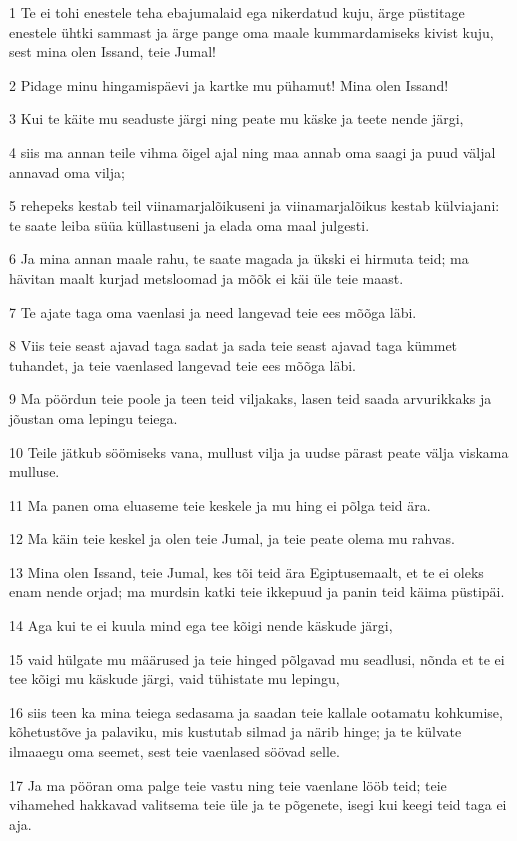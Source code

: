 \par 1 Te ei tohi enestele teha ebajumalaid ega nikerdatud kuju, ärge püstitage enestele ühtki sammast ja ärge pange oma maale kummardamiseks kivist kuju, sest mina olen Issand, teie Jumal!
\par 2 Pidage minu hingamispäevi ja kartke mu pühamut! Mina olen Issand!
\par 3 Kui te käite mu seaduste järgi ning peate mu käske ja teete nende järgi,
\par 4 siis ma annan teile vihma õigel ajal ning maa annab oma saagi ja puud väljal annavad oma vilja;
\par 5 rehepeks kestab teil viinamarjalõikuseni ja viinamarjalõikus kestab külviajani: te saate leiba süüa küllastuseni ja elada oma maal julgesti.
\par 6 Ja mina annan maale rahu, te saate magada ja ükski ei hirmuta teid; ma hävitan maalt kurjad metsloomad ja mõõk ei käi üle teie maast.
\par 7 Te ajate taga oma vaenlasi ja need langevad teie ees mõõga läbi.
\par 8 Viis teie seast ajavad taga sadat ja sada teie seast ajavad taga kümmet tuhandet, ja teie vaenlased langevad teie ees mõõga läbi.
\par 9 Ma pöördun teie poole ja teen teid viljakaks, lasen teid saada arvurikkaks ja jõustan oma lepingu teiega.
\par 10 Teile jätkub söömiseks vana, mullust vilja ja uudse pärast peate välja viskama mulluse.
\par 11 Ma panen oma eluaseme teie keskele ja mu hing ei põlga teid ära.
\par 12 Ma käin teie keskel ja olen teie Jumal, ja teie peate olema mu rahvas.
\par 13 Mina olen Issand, teie Jumal, kes tõi teid ära Egiptusemaalt, et te ei oleks enam nende orjad; ma murdsin katki teie ikkepuud ja panin teid käima püstipäi.
\par 14 Aga kui te ei kuula mind ega tee kõigi nende käskude järgi,
\par 15 vaid hülgate mu määrused ja teie hinged põlgavad mu seadlusi, nõnda et te ei tee kõigi mu käskude järgi, vaid tühistate mu lepingu,
\par 16 siis teen ka mina teiega sedasama ja saadan teie kallale ootamatu kohkumise, kõhetustõve ja palaviku, mis kustutab silmad ja närib hinge; ja te külvate ilmaaegu oma seemet, sest teie vaenlased söövad selle.
\par 17 Ja ma pööran oma palge teie vastu ning teie vaenlane lööb teid; teie vihamehed hakkavad valitsema teie üle ja te põgenete, isegi kui keegi teid taga ei aja.
